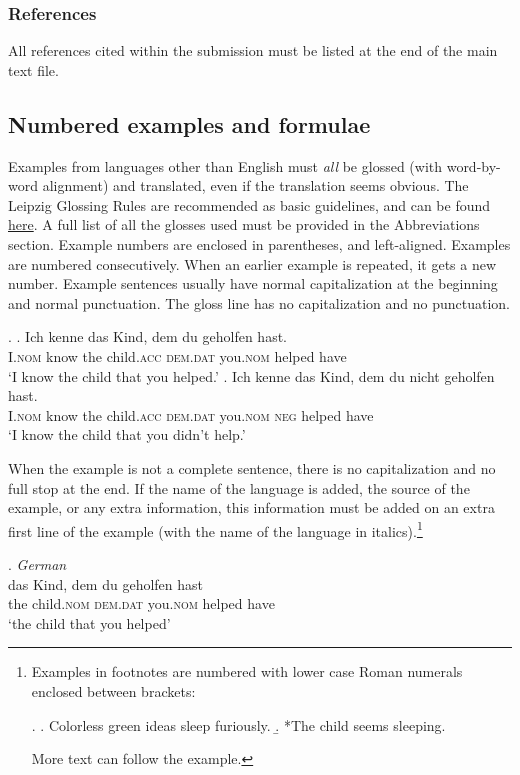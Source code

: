\documentclass[charis,linguex]{glossa}
\begin{document}
\subsubsection{References}
All references cited within the submission must be listed at the end of the main text file.

\subsection{Numbered examples and formulae}

Examples from languages other than English must \emph{all} be glossed (with word-by-word alignment) and translated, even if the translation seems obvious. The Leipzig Glossing Rules are recommended as basic guidelines, and can be found \href{http://www.eva.mpg.de/lingua/resources/glossing-rules.php}{here}. A full list of all the glosses used must be provided in the Abbreviations section. Example numbers are enclosed in parentheses, and left-aligned. Examples are numbered consecutively. When an earlier example is repeated, it gets a new number. Example sentences usually have normal capitalization at the beginning and normal punctuation. The gloss line has no capitalization and no punctuation. 

\ex. \ag. Ich   kenne das Kind, dem du geholfen hast.\\
I.\textsc{nom} know the child.\textsc{acc} \textsc{dem.dat} you.\textsc{nom} helped have\\
\glt `I know the child that you helped.'
\bg. Ich kenne das Kind, dem du nicht geholfen hast. \\
I.\textsc{nom} know  the child.\textsc{acc} \textsc{dem.dat} you.\textsc{nom} \textsc{neg} helped   have\\
\glt `I know the child that you didn’t help.’

When the example is not a complete sentence, there is no capitalization and no full stop at the end. If the name of the language is added, the source of the example, or any extra information, this information must be added on an extra first line of the example (with the name of the language in italics).\footnote{Examples in footnotes are numbered with lower case Roman numerals enclosed between brackets:

\ex.
\a. Colorless green ideas sleep furiously.
\b. *The child seems sleeping.

More text can follow the example.}

\ex. \textit{German} \citep{coetsem:2000}\\ %
\gll das Kind, dem du geholfen hast\\  %
the child.\textsc{nom} \textsc{dem.dat} you.\textsc{nom}  helped have\\ %
\glt `the child that you helped' %
\end{document}
